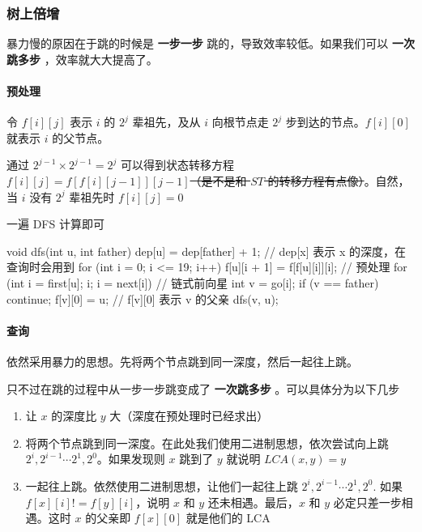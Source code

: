 \subsubsection{树上倍增}

暴力慢的原因在于跳的时候是 \textbf{ 一步一步 } 跳的，导致效率较低。如果我们可以 \textbf{ 一次跳多步 }，效率就大大提高了。

\paragraph{预处理}

令 $f[i][j]$ 表示 $i$ 的 $2^j$ 辈祖先，及从 $i$ 向根节点走 $2^j$ 步到达的节点。$f[i][0]$ 就表示 $i$ 的父节点。

通过 $2^{j-1}\times 2^{j-1}=2^j$ 可以得到状态转移方程 $f[i][j]=f[f[i][j-1]][j-1]$\sout{（是不是和 $ST$ 的转移方程有点像）}。自然，当 $i$ 没有 $2^j$ 辈祖先时 $f[i][j]=0$

一遍 DFS 计算即可

\begin{cppcode}
void dfs(int u, int father) {
  dep[u] = dep[father] + 1;  // dep[x] 表示 x 的深度，在查询时会用到
  for (int i = 0; i <= 19; i++) f[u][i + 1] = f[f[u][i]][i];  // 预处理
  for (int i = first[u]; i; i = next[i])                      // 链式前向星
  {
    int v = go[i];
    if (v == father) continue;
    f[v][0] = u;  // f[v][0] 表示 v 的父亲
    dfs(v, u);
  }
}
\end{cppcode}

\paragraph{查询}

依然采用暴力的思想。先将两个节点跳到同一深度，然后一起往上跳。

只不过在跳的过程中从一步一步跳变成了 \textbf{ 一次跳多步 }。可以具体分为以下几步

\begin{enumerate}
\item 让 $x$ 的深度比 $y$ 大（深度在预处理时已经求出）
\item 将两个节点跳到同一深度。在此处我们使用二进制思想，依次尝试向上跳 $2^i,2^{i-1}\cdots 2^1,2^0$。如果发现则 $x$ 跳到了 $y$ 就说明 $LCA(x,y)=y$
\item 一起往上跳。依然使用二进制思想，让他们一起往上跳 $2^i,2^{i-1}\cdots 2^1,2^0$. 如果 $f[x][i]!=f[y][i]$，说明 $x$ 和 $y$ 还未相遇。最后，$x$ 和 $y$ 必定只差一步相遇。这时 $x$ 的父亲即 $f[x][0]$ 就是他们的 LCA
\end{enumerate}

